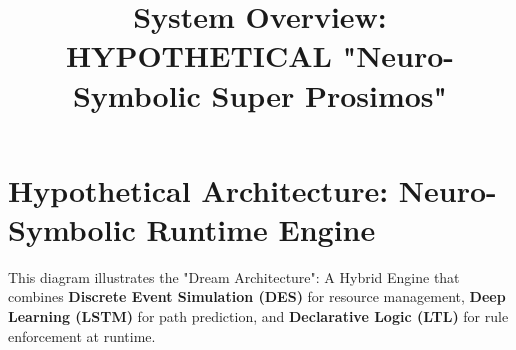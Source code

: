\documentclass[a4paper]{article}
\begin{document}
\title{System Overview: HYPOTHETICAL "Neuro-Symbolic Super Prosimos"}
\author{}
\date{}
\maketitle

\section{Hypothetical Architecture: Neuro-Symbolic Runtime Engine}

This diagram illustrates the "Dream Architecture": A Hybrid Engine that combines \textbf{Discrete Event Simulation (DES)} for resource management, \textbf{Deep Learning (LSTM)} for path prediction, and \textbf{Declarative Logic (LTL)} for rule enforcement at runtime.
\end{document}
